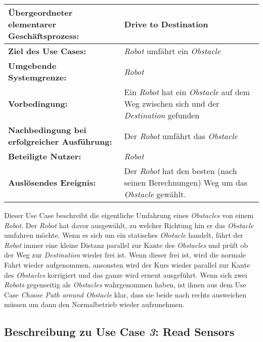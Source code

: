 			\begin{table}[H]
				\centering
				\begin{tabularx}{\textwidth}{@{}p{5cm}X@{}}
				\hline
				\textbf{Übergeordneter elementarer Geschäftsprozess:} & Drive to Destination\\ \hline
				\textbf{Ziel des Use Cases:} & \emph{Robot} umfährt ein \emph{Obstacle} \\ \hline
				\textbf{Umgebende Systemgrenze:} & \emph{Robot} \\ \hline
				\textbf{Vorbedingung:} & Ein \emph{Robot} hat ein \emph{Obstacle} auf dem Weg zwischen sich und der \emph{Destination} gefunden\\ \hline
				\textbf{Nachbedingung bei erfolgreicher Ausführung:} & 
				Der \emph{Robot} umfährt das \emph{Obstacle} \\ \hline
				\textbf{Beteiligte Nutzer:} & \emph{Robot} \\ \hline
				\textbf{Auslösendes Ereignis:} & Der \emph{Robot} hat den besten (nach seinen Berechnungen) Weg um das \emph{Obstacle} gewählt. \\ \hline
				\end{tabularx}
			\end{table}
		Dieser Use Case beschreibt die eigentliche Umfahrung eines \emph{Obstacles} von einem \emph{Robot}. Der \emph{Robot} hat davor ausgewählt, zu welcher Richtung hin er das \emph{Obstacle} umfahren möchte. Wenn es sich um ein statisches \emph{Obstacle} handelt, fährt der \emph{Robot} immer eine kleine Distanz parallel zur Kante des \emph{Obstacles} und prüft ob der Weg zur \emph{Destination} wieder frei ist. Wenn dieser frei ist, wird die normale Fahrt wieder aufgenommen, ansonsten wird der Kurs wieder parallel zur Kante des \emph{Obstacles} korrigiert und das ganze wird erneut ausgeführt. Wenn sich zwei \emph{Robots} gegenseitig als \emph{Obstacles} wahrgenommen haben, ist ihnen aus dem Use Case \textit{Choose Path around Obstacle} klar, dass sie beide nach rechts ausweichen müssen um dann den Normalbetrieb wieder aufzunehmen.
			
			
		\pagebreak

		\subsection{Beschreibung zu Use Case \emph{3}: Read Sensors}

